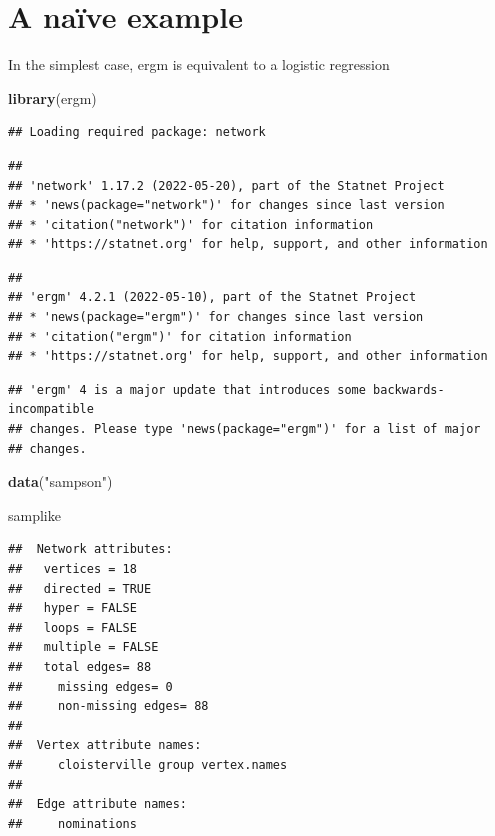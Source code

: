\documentclass[]{book}
\newenvironment{Shaded}{\begin{snugshade}}{\end{snugshade}}
\newcommand{\KeywordTok}[1]{\textcolor[rgb]{0.13,0.29,0.53}{\textbf{#1}}}
\newcommand{\NormalTok}[1]{#1}
\newcommand{\StringTok}[1]{\textcolor[rgb]{0.31,0.60,0.02}{#1}}
\begin{document}
\hypertarget{a-nauxefve-example}{%
\section{A naïve example}\label{a-nauxefve-example}}

In the simplest case, ergm is equivalent to a logistic regression

\begin{Shaded}
\begin{Highlighting}[]
\KeywordTok{library}\NormalTok{(ergm)}
\end{Highlighting}
\end{Shaded}

\begin{verbatim}
## Loading required package: network
\end{verbatim}

\begin{verbatim}
## 
## 'network' 1.17.2 (2022-05-20), part of the Statnet Project
## * 'news(package="network")' for changes since last version
## * 'citation("network")' for citation information
## * 'https://statnet.org' for help, support, and other information
\end{verbatim}

\begin{verbatim}
## 
## 'ergm' 4.2.1 (2022-05-10), part of the Statnet Project
## * 'news(package="ergm")' for changes since last version
## * 'citation("ergm")' for citation information
## * 'https://statnet.org' for help, support, and other information
\end{verbatim}

\begin{verbatim}
## 'ergm' 4 is a major update that introduces some backwards-incompatible
## changes. Please type 'news(package="ergm")' for a list of major
## changes.
\end{verbatim}

\begin{Shaded}
\begin{Highlighting}[]
\KeywordTok{data}\NormalTok{(}\StringTok{"sampson"}\NormalTok{)}

\NormalTok{samplike}
\end{Highlighting}
\end{Shaded}

\begin{verbatim}
##  Network attributes:
##   vertices = 18 
##   directed = TRUE 
##   hyper = FALSE 
##   loops = FALSE 
##   multiple = FALSE 
##   total edges= 88 
##     missing edges= 0 
##     non-missing edges= 88 
## 
##  Vertex attribute names: 
##     cloisterville group vertex.names 
## 
##  Edge attribute names: 
##     nominations
\end{verbatim}
\end{document}
